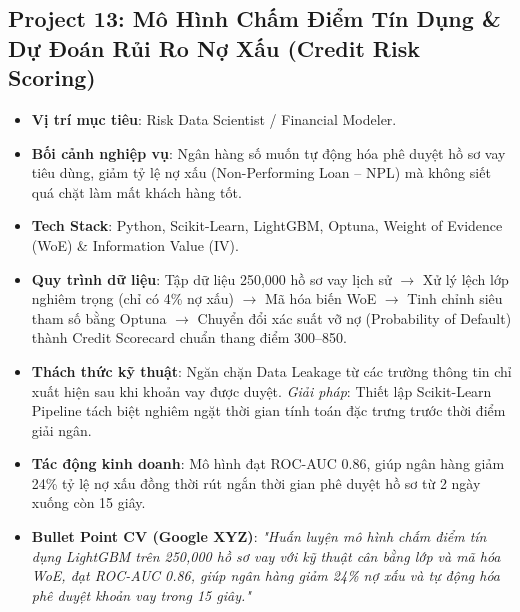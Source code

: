 \subsection{Project 13: Mô Hình Chấm Điểm Tín Dụng \& Dự Đoán Rủi Ro Nợ Xấu (Credit Risk Scoring)}
\begin{itemize}
    \item \textbf{Vị trí mục tiêu}: Risk Data Scientist / Financial Modeler.
    \item \textbf{Bối cảnh nghiệp vụ}: Ngân hàng số muốn tự động hóa phê duyệt hồ sơ vay tiêu dùng, giảm tỷ lệ nợ xấu (Non-Performing Loan -- NPL) mà không siết quá chặt làm mất khách hàng tốt.
    \item \textbf{Tech Stack}: Python, Scikit-Learn, LightGBM, Optuna, Weight of Evidence (WoE) \& Information Value (IV).
    \item \textbf{Quy trình dữ liệu}: Tập dữ liệu 250,000 hồ sơ vay lịch sử $\rightarrow$ Xử lý lệch lớp nghiêm trọng (chỉ có 4\% nợ xấu) $\rightarrow$ Mã hóa biến WoE $\rightarrow$ Tinh chỉnh siêu tham số bằng Optuna $\rightarrow$ Chuyển đổi xác suất vỡ nợ (Probability of Default) thành Credit Scorecard chuẩn thang điểm 300--850.
    \item \textbf{Thách thức kỹ thuật}: Ngăn chặn Data Leakage từ các trường thông tin chỉ xuất hiện sau khi khoản vay được duyệt. \textit{Giải pháp}: Thiết lập Scikit-Learn Pipeline tách biệt nghiêm ngặt thời gian tính toán đặc trưng trước thời điểm giải ngân.
    \item \textbf{Tác động kinh doanh}: Mô hình đạt ROC-AUC 0.86, giúp ngân hàng giảm 24\% tỷ lệ nợ xấu đồng thời rút ngắn thời gian phê duyệt hồ sơ từ 2 ngày xuống còn 15 giây.
    \item \textbf{Bullet Point CV (Google XYZ)}: \textit{"Huấn luyện mô hình chấm điểm tín dụng LightGBM trên 250,000 hồ sơ vay với kỹ thuật cân bằng lớp và mã hóa WoE, đạt ROC-AUC 0.86, giúp ngân hàng giảm 24\% nợ xấu và tự động hóa phê duyệt khoản vay trong 15 giây."}
\end{itemize}


